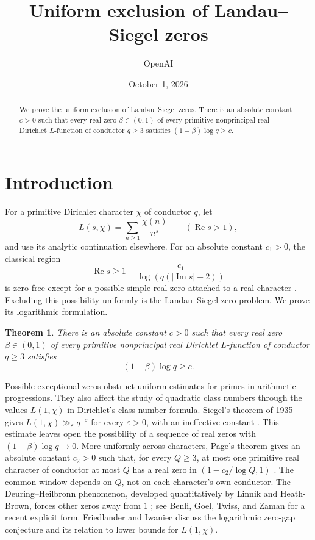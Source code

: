\documentclass[11pt,a4paper]{amsart}
\title{Uniform exclusion of Landau--Siegel zeros}
\author{OpenAI}
\date{October 1, 2026}
\newtheorem{theorem}{Theorem}
\theoremstyle{remark}
\numberwithin{equation}{section}
\begin{document}
\begin{abstract}
We prove the uniform exclusion of Landau--Siegel zeros. There is an
absolute constant $c>0$ such that every real zero $\beta\in(0,1)$ of
every primitive nonprincipal real Dirichlet $L$-function of conductor
$q\ge3$ satisfies $(1-\beta)\log q\ge c$.
\end{abstract}
\maketitle

\section{Introduction}\label{sec:intro}

For a primitive Dirichlet character $\chi$ of conductor $q$, let
\[
 L(s,\chi)=\sum_{n\ge1}\frac{\chi(n)}{n^s}
 \qquad(\operatorname{Re}s>1),
\]
and use its analytic continuation elsewhere. For an absolute constant
$c_1>0$, the classical region
\[
 \operatorname{Re}s\ge1-\frac{c_1}{\log(q(|\operatorname{Im}s|+2))}
\]
is zero-free except for a possible simple real zero attached to a real
character \cite[Section~14]{Davenport}. Excluding this possibility
uniformly is the Landau--Siegel zero problem. We prove its logarithmic
formulation.

\begin{theorem}\label{thm:main}
There is an absolute constant $c>0$ such that every real zero
$\beta\in(0,1)$ of every primitive nonprincipal real Dirichlet
$L$-function of conductor $q\ge3$ satisfies
\begin{equation}\label{eq:main}
 (1-\beta)\log q\ge c.
\end{equation}
\end{theorem}

Possible exceptional zeros obstruct uniform estimates for primes in
arithmetic progressions. They also affect the study of quadratic
class numbers through the values $L(1,\chi)$ in Dirichlet's
class-number formula. Siegel's theorem of 1935 gives
$L(1,\chi)\gg_\varepsilon q^{-\varepsilon}$ for every
$\varepsilon>0$, with an ineffective constant \cite{Siegel,Davenport}.
This estimate leaves open the possibility of a sequence of real zeros
with $(1-\beta)\log q\to0$. More uniformly across characters,
Page's theorem gives an absolute constant $c_2>0$ such that, for every
$Q\ge3$, at most one primitive real character of conductor at most $Q$
has a real zero in $(1-c_2/\log Q,1)$ \cite{Page}. The common window
depends on $Q$, not on each character's own conductor.
The Deuring--Heilbronn phenomenon, developed quantitatively by
Linnik and Heath-Brown, forces
other zeros away from $1$ \cite{Linnik,HeathBrown}; see Benli,
Goel, Twiss, and Zaman \cite{BGTZ} for a recent explicit form.
Friedlander and Iwaniec
\cite{FI} discuss the logarithmic zero-gap conjecture and its relation
to lower bounds for $L(1,\chi)$.
\end{document}
